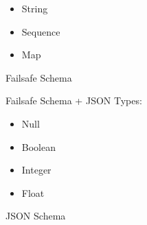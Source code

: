 \begin{figure}[H]
  \begin{minipage}[t]{0.48\textwidth}
    \vspace{0pt}
    \begin{bchart}[max=9, width=0.85\textwidth]
      \bcxlabel{}
    \end{bchart}
  \end{minipage}
  \begin{minipage}[t]{0.48\textwidth}
    \vspace{0pt}
    \begin{itemize}
      \item String
      \item Sequence
      \item Map
    \end{itemize}
  \end{minipage}
  \caption{Failsafe Schema}
\end{figure}

\begin{figure}[H]
  \begin{minipage}[t]{0.48\textwidth}
    \vspace{0pt}
    \begin{bchart}[max=9, width=0.85\textwidth]
    \end{bchart}
  \end{minipage}
  \begin{minipage}[t]{0.48\textwidth}
    \vspace{0pt}
    Failsafe Schema + \gls{JSON} Types:
    \begin{minipage}[t]{2cm}
      \begin{itemize}[leftmargin=*]
        \item Null
        \item Boolean
        \item Integer
        \item Float
      \end{itemize}
    \end{minipage}
  \end{minipage}
  \caption{JSON Schema}
\end{figure}

